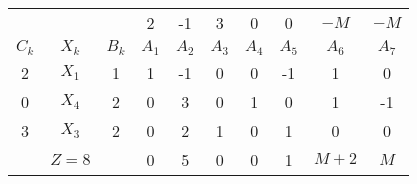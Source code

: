 \begin{tabular}{cccccccccc}
       &        &        & 2      & -1     & 3      & 0      & 0      & $-M$   & $-M$ \\
$C_k$  & $X_k$  & $B_k$  & $A_1$  & $A_2$  & $A_3$  & $A_4$  & $A_5$  & $A_6$  & $A_7$ \bigstrut[b]\\
\hline
\hline
2      & $X_1$  & 1      & 1      & -1     & 0      & 0      & -1     & 1      & 0 \bigstrut[t]\\
0      & $X_4$  & 2      & 0      & 3      & 0      & 1      & 0      & 1      & -1 \\
3      & $X_3$  & 2      & 0      & 2      & 1      & 0      & 1      & 0      & 0 \bigstrut[b]\\
\hline
       & $Z=8$  &        & 0      & 5      & 0      & 0      & 1      & $M+2$  & $M$ \bigstrut\\
\hline
\hline
\end{tabular}%
